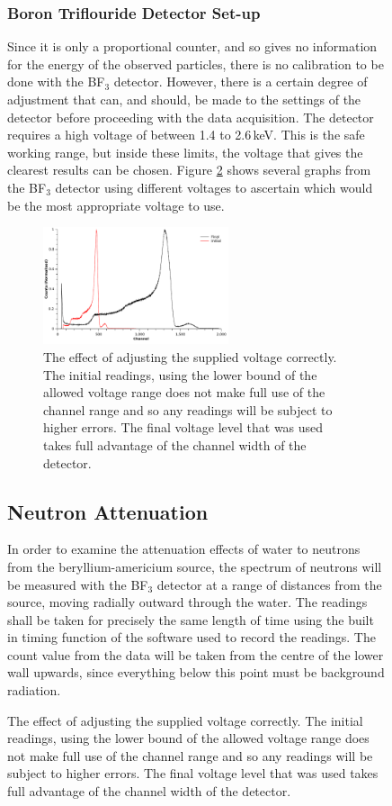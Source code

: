 \begin{figure}[ht]
\subsubsection{Boron Triflouride Detector Set-up} %
\label{ssub:boron_triflouride_detector_set_up}
Since it is only a proportional counter, and so gives no information for the energy of the observed particles, there is no calibration to be done with the BF$_3$ detector. However, there is a certain degree of adjustment that can, and should, be made to the settings of the detector before proceeding with the data acquisition. The detector requires a high voltage of between 1.4 to 2.6\,keV. This is the safe working range, but inside these limits, the voltage that gives the clearest results can be chosen. Figure \ref{fig:bf3voltages} shows several graphs from the BF$_3$ detector using different voltages to ascertain which would be the most appropriate voltage to use.
\begin{figure}[ht]
  \centering
  \includegraphics[width=0.6\textwidth]{BF3_calib_voltage.pdf}
  \caption{The effect of adjusting the supplied voltage correctly. The initial readings, using the lower bound of the allowed voltage range does not make full use of the channel range and so any readings will be subject to higher errors. The final voltage level that was used takes full advantage of the channel width of the detector. \label{fig:bf3voltages}}
\end{figure}

\subsection{Neutron Attenuation} %
\label{sub:neutron_attenuation}In order to examine the attenuation effects of water to neutrons from the beryllium-americium source, the spectrum of neutrons will be measured with the BF$_3$ detector at a range of distances from the source, moving radially outward through the water. The readings shall be taken for precisely the same length of time using the built in timing function of the software used to record the readings. The count value from the data will be taken from the centre of the lower wall upwards, since everything below this point must be background radiation.


\end{figure}
